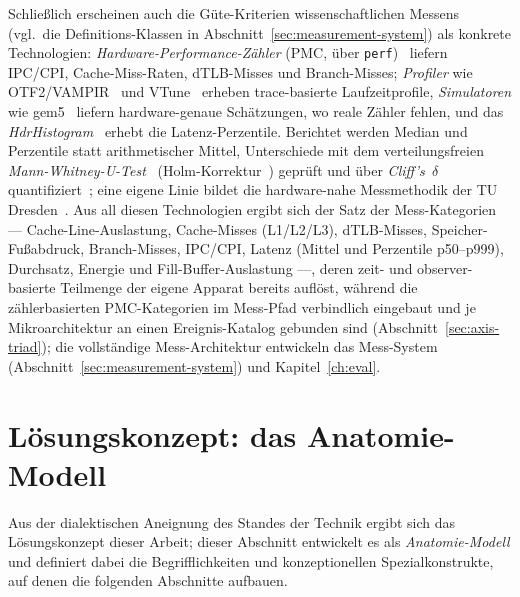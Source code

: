 \begin{nurkurz}
Schließlich erscheinen auch die Güte-Kriterien wissenschaftlichen Messens (vgl.\ die Definitions-Klassen in
Abschnitt~\ref{sec:measurement-system}) als konkrete Technologien: \emph{Hardware-Performance-Zähler} (PMC, über
\texttt{perf})~\cite{demelo2010perf} liefern IPC/CPI, Cache-Miss-Raten, dTLB-Misses und Branch-Misses;
\emph{Profiler} wie OTF2/VAMPIR~\cite{berthold2023vampir} und VTune~\cite{reinders2005vtune} erheben
trace-basierte Laufzeitprofile, \emph{Simulatoren} wie gem5~\cite{binkert2011gem5} liefern hardware-genaue
Schätzungen, wo reale Zähler fehlen, und das \emph{HdrHistogram}~\cite{tene_hdrhistogram} erhebt die
Latenz-Perzentile. Berichtet werden Median und Perzentile statt arithmetischer Mittel, Unterschiede mit dem
verteilungsfreien \emph{Mann-Whitney-U-Test}~\cite{mann1947utest} (Holm-Korrektur~\cite{holm1979sequential})
geprüft und über \emph{Cliff's~$\delta$}~\cite{cliff1993dominance} quantifiziert~\cite{hoefler2015benchmarking};
eine eigene Linie bildet die hardware-nahe Messmethodik der TU
Dresden~\cite{ungethuem2017survey,schmidt2025hbm,berthold2023vampir}. Aus all diesen Technologien ergibt sich
der Satz der Mess-Kategorien ---
Cache-Line-Auslastung, Cache-Misses (L1/L2/L3), dTLB-Misses, Speicher-Fußabdruck, Branch-Misses,
IPC/CPI, Latenz (Mittel und Perzentile p50--p999), Durchsatz, Energie und Fill-Buffer-Auslastung ---,
deren zeit- und observer-basierte Teilmenge der eigene Apparat bereits auflöst, während die zählerbasierten
PMC-Kategorien im Mess-Pfad verbindlich eingebaut und je Mikroarchitektur an einen Ereignis-Katalog gebunden
sind (Abschnitt~\ref{sec:axis-triad}); die vollständige Mess-Architektur entwickeln das Mess-System
(Abschnitt~\ref{sec:measurement-system}) und Kapitel~\ref{ch:eval}.
\end{nurkurz}

\section{Lösungskonzept: das Anatomie-Modell}\label{sec:anatomy-model}
Aus der dialektischen Aneignung des Standes der Technik ergibt sich das Lösungskonzept dieser Arbeit;
dieser Abschnitt entwickelt es als \emph{Anatomie-Modell} und definiert dabei die Begrifflichkeiten und
konzeptionellen Spezialkonstrukte, auf denen die folgenden Abschnitte aufbauen.

